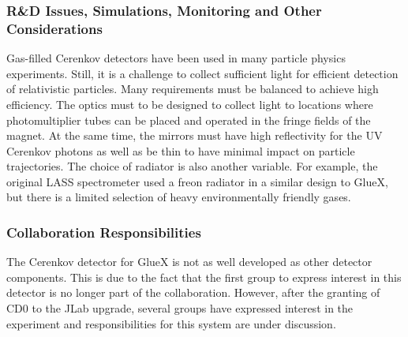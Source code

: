 \subsubsection*{R\&D Issues, Simulations, Monitoring and Other Considerations}

Gas-filled Cerenkov detectors have been used in many particle physics 
experiments. Still, it is a challenge to collect
sufficient light for efficient detection of relativistic
particles. Many requirements must be balanced to achieve high efficiency.
The optics must to be designed to collect light to locations
where photomultiplier tubes can be placed and operated in the fringe
fields of the magnet. At the same time, the mirrors must have high reflectivity for the UV Cerenkov
photons as well as be thin to have minimal impact on particle trajectories.
The choice of radiator is also another variable. For example, the 
original LASS spectrometer used a freon radiator in a 
similar design to GlueX, but there is a limited selection of heavy
environmentally friendly gases. 

\subsubsection*{Collaboration Responsibilities}

The Cerenkov detector for GlueX is not as well developed as other detector components.
This is due to the fact that the first group to express interest in this detector
is no longer part of the collaboration. 
However, after the granting of CD0 to the JLab upgrade,
several groups have expressed interest in the experiment and responsibilities
for this system are under discussion.
